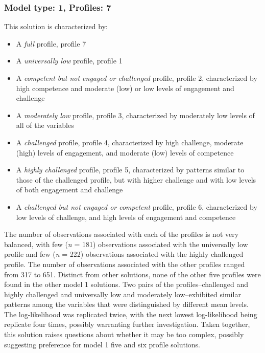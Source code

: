 \documentclass[]{msu-thesis}
\providecommand{\tightlist}{%
  \setlength{\itemsep}{0pt}\setlength{\parskip}{0pt}}
\theoremstyle{definition}
\theoremstyle{definition}
\theoremstyle{definition}
\theoremstyle{remark}
\begin{document}
\subsubsection{Model type: 1, Profiles:
7}\label{model-type-1-profiles-7}

This solution is characterized by:

\begin{itemize}
\tightlist
\item
  A \emph{full} profile, profile 7
\item
  A \emph{universally low} profile, profile 1
\item
  A \emph{competent but not engaged or challenged} profile, profile 2,
  characterized by high competence and moderate (low) or low levels of
  engagement and challenge
\item
  A \emph{moderately low} profile, profile 3, characterized by
  moderately low levels of all of the variables
\item
  A \emph{challenged} profile, profile 4, characterized by high
  challenge, moderate (high) levels of engagement, and moderate (low)
  levels of competence
\item
  A \emph{highly challenged} profile, profile 5, characterized by
  patterns similar to those of the challenged profile, but with higher
  challenge and with low levels of both engagement and challenge
\item
  A \emph{challenged but not engaged or competent} profile, profile 6,
  characterized by low levels of challenge, and high levels of
  engagement and competence
\end{itemize}

The number of observations associated with each of the profiles is not
very balanced, with few (\emph{n} = 181) observations associated with
the universally low profile and few (\emph{n} = 222) observations
associated with the highly challenged profile. The number of
observations associated with the other profiles ranged from 317 to 651.
Distinct from other solutions, none of the other five profiles were
found in the other model 1 solutions. Two pairs of the
profiles--challenged and highly challenged and universally low and
moderately low--exhibited similar patterns among the variables that were
distinguished by different mean levels. The log-likelihood was
replicated twice, with the next lowest log-likelihood being replicate
four times, possibly warranting further investigation. Taken together,
this solution raises questions about whether it may be too complex,
possibly suggesting preference for model 1 five and six profile
solutions.
\end{document}

